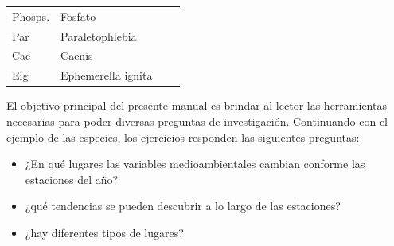 \documentclass[
  spanish,
]{article}
\providecommand{\tightlist}{%
  \setlength{\itemsep}{0pt}\setlength{\parskip}{0pt}}
\begin{document}
\begin{longtable}[]{@{}llll@{}}
\begin{minipage}[t]{0.14\columnwidth}
Phosps.\strut
\end{minipage} & \begin{minipage}[t]{0.35\columnwidth}\raggedright
Fosfato\strut
\end{minipage}\tabularnewline
\begin{minipage}[t]{0.12\columnwidth}\raggedright
Par\strut
\end{minipage} & \begin{minipage}[t]{0.27\columnwidth}\raggedright
Paraletophlebia\strut
\end{minipage} & \begin{minipage}[t]{0.14\columnwidth}\raggedright
\strut
\end{minipage} & \begin{minipage}[t]{0.35\columnwidth}\raggedright
\strut
\end{minipage}\tabularnewline
\begin{minipage}[t]{0.12\columnwidth}\raggedright
Cae\strut
\end{minipage} & \begin{minipage}[t]{0.27\columnwidth}\raggedright
Caenis\strut
\end{minipage} & \begin{minipage}[t]{0.14\columnwidth}\raggedright
\strut
\end{minipage} & \begin{minipage}[t]{0.35\columnwidth}\raggedright
\strut
\end{minipage}\tabularnewline
\begin{minipage}[t]{0.12\columnwidth}\raggedright
Eig\strut
\end{minipage} & \begin{minipage}[t]{0.27\columnwidth}\raggedright
Ephemerella ignita\strut
\end{minipage} & \begin{minipage}[t]{0.14\columnwidth}\raggedright
\strut
\end{minipage} & \begin{minipage}[t]{0.35\columnwidth}\raggedright
\strut
\end{minipage}\tabularnewline
\bottomrule
\end{longtable}

El objetivo principal del presente manual es brindar al lector las herramientas necesarias para poder diversas preguntas de investigación. Continuando con el ejemplo de las especies, los ejercicios responden las siguientes preguntas:

\begin{itemize}
\tightlist
\item
  ¿En qué lugares las variables medioambientales cambian conforme las estaciones del año?
\item
  ¿qué tendencias se pueden descubrir a lo largo de las estaciones?
\item
  ¿hay diferentes tipos de lugares?
\end{itemize}
\end{document}
